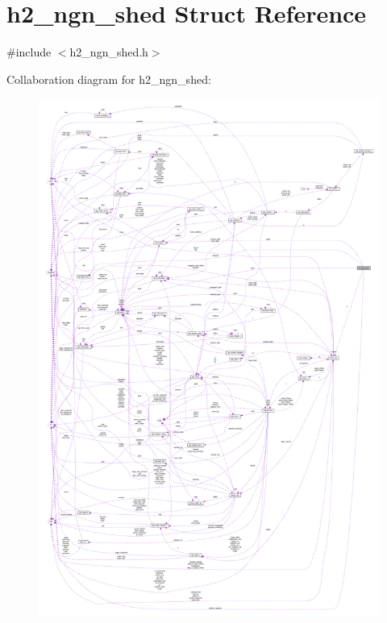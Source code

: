 \hypertarget{structh2__ngn__shed}{}\section{h2\+\_\+ngn\+\_\+shed Struct Reference}
\label{structh2__ngn__shed}


{\ttfamily \#include $<$h2\+\_\+ngn\+\_\+shed.\+h$>$}



Collaboration diagram for h2\+\_\+ngn\+\_\+shed\+:
\nopagebreak
\begin{figure}[H]
\begin{center}
\leavevmode
\includegraphics[width=350pt]{structh2__ngn__shed__coll__graph}
\end{center}
\end{figure}
